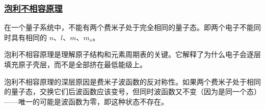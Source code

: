 \subsubsection{\protect\hyperlink{:}{泡利不相容原理}}

\begin{theorem}[泡利不相容原理]
    在一个量子系统中，不能有两个费米子处于完全相同的量子态。即两个电子不能同时具有相同的 $n$、$l$、$m$、$m_s$。
\end{theorem}

泡利不相容原理是理解原子结构和元素周期表的关键。它解释了为什么电子会逐层填充原子壳层，而不是全部挤在最低能级上。

\begin{remark}
    泡利不相容原理的深层原因是费米子波函数的反对称性。如果两个费米子处于相同的量子态，交换它们后波函数应该变号，但同时波函数又不变（因为是同一个态）——唯一的可能是波函数为零，即这种状态不存在。
\end{remark}

